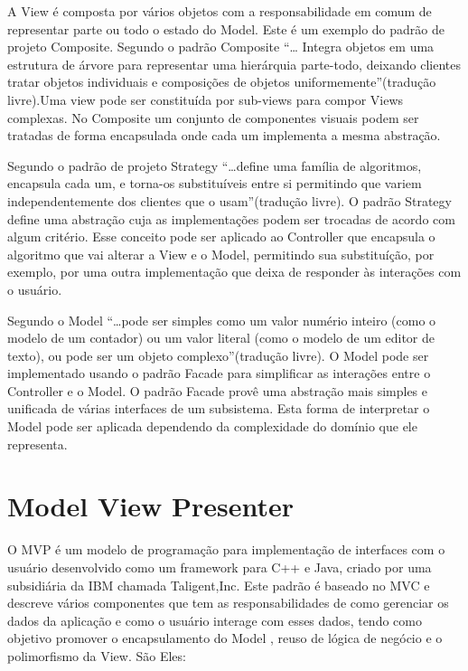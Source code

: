 A View é composta por vários objetos com a responsabilidade em comum de
representar parte ou todo o estado do Model. Este é um exemplo do padrão de
projeto Composite. Segundo  o padrão Composite ``\ldots
Integra objetos em uma estrutura de árvore para representar uma hierárquia
parte-todo, deixando clientes tratar objetos individuais e composições de
objetos uniformemente''(tradução livre).Uma view pode ser constituída por
sub-views para compor Views complexas. No Composite  um conjunto de componentes
visuais podem ser tratadas de forma encapsulada onde cada um implementa a
mesma abstração. 

Segundo  o padrão de projeto Strategy ``\ldots define uma
família de algoritmos, encapsula cada um, e torna-os substituíveis entre si
permitindo que variem independentemente dos clientes que o usam''(tradução
livre). O padrão Strategy define uma abstração cuja as implementações podem ser
trocadas de acordo com algum critério. Esse conceito pode ser aplicado ao
Controller que encapsula o algoritmo que vai alterar a View e o Model,
permitindo sua substituíção, por exemplo, por uma outra implementação que deixa
de responder às interações com o usuário.

Segundo  o Model ``\ldots pode ser simples como
um valor numério inteiro (como o modelo de um contador) ou um valor literal
(como o modelo de um editor de texto), ou pode ser um objeto complexo''(tradução
livre). O Model pode ser implementado usando o padrão Facade para simplificar
as interações entre o Controller e o Model. O padrão Facade provê
uma abstração mais simples e unificada de várias interfaces de um
subsistema\cite{gof}. Esta forma de interpretar o Model pode ser aplicada
dependendo da complexidade do domínio que ele representa.

\section{Model View Presenter}

O MVP é um modelo de programação para implementação de interfaces com o usuário
desenvolvido como um framework para C++ e Java, criado por uma subsidiária da
IBM chamada Taligent,Inc. Este padrão é baseado no MVC e descreve vários
componentes que tem as responsabilidades de como gerenciar os dados da aplicação
e como o usuário interage com esses dados, tendo como objetivo promover o
encapsulamento do Model , reuso de lógica de negócio e o polimorfismo da View.
São Eles:

